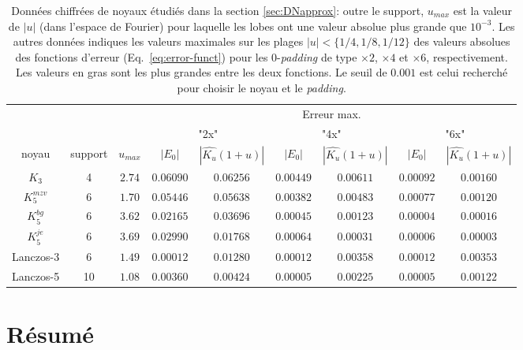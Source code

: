 \documentclass[11pt,twoside]{article}
\begin{document}
\begin{table}
\small
\centering
\begin{tabular}{c|c|c|cc|cc|cc}
\toprule
         &         &           & \multicolumn{6}{c}{Erreur max.} \\ 
         &         &           & \multicolumn{2}{c}{"2x"} & \multicolumn{2}{|c}{"4x"} & \multicolumn{2}{|c}{"6x"} \\
noyau    & support & $u_{max}$  &   $|E_0|$ & $|\widehat{K_u}(1+u)|$ & $|E_0|$ & $|\widehat{K_u}(1+u)|$ & $|E_0|$ & $|\widehat{K_u}(1+u)|$  \\ \midrule
$K_3$    &   4     &  $2.74$   &   $0.06090$ &	 $\mathbf{0.06256}$ & $0.00449$ & 	 $\mathbf{0.00611}$ & $ 0.00092$ &  	$\mathbf{0.00160}$ \\
$K_5^{mzv}$ & 6    & $1.70$ &   $0.05446$ 	& $\mathbf{0.05638}$ & $0.00382$ & $\mathbf{0.00483}$ &  $0.00077$ 	 & $\mathbf{0.00120}$ \\
$K_5^{bg}$ & 6    & $3.62$ &   $0.02165$ 	& $\mathbf{0.03696}$ & $0.00045$ & $\mathbf{0.00123}$ &  $0.00004$ 	 & $\mathbf{0.00016}$ \\
$K_5^{je}$ & 6    & $3.69$ &   $0.02990$ 	& $\mathbf{0.01768}$ & $\mathbf{0.00064}$ & $0.00031$ &  $\mathbf{0.00006}$ 	 & $0.00003$ \\
Lanczos-3 & 6     &  $1.49$ &  $0.00012$ 	 & $\mathbf{0.01280}$ & $0.00012$ &  	$\mathbf{0.00358}$ & $0.00012$ &  	 $\mathbf{0.00353}$ \\
Lanczos-5 & 10    &  $1.08$ & $0.00360$  &  $\mathbf{0.00424}$ & $0.00005$ & $\mathbf{0.00225}$ & $0.00005$ & 	 $\mathbf{0.00122}$ \\
\bottomrule
\end{tabular}
\caption{Données chiffrées de noyaux étudiés dans la section \ref{sec:DNapprox}: outre le support, $u_{max}$ est la valeur de $|u|$ (dans l'espace de Fourier) pour laquelle les lobes ont une valeur absolue plus grande que $10^{-3}$. Les autres données indiques les valeurs maximales sur les plages $|u|<\{1/4,1/8,1/12\}$ des valeurs absolues des fonctions d'erreur (Eq.~\ref{eq:error-funct}) pour les 0-\textit{padding} de type $\times 2$, $\times 4$ et $\times 6$, respectivement. Les valeurs en gras sont les plus grandes entre les deux fonctions. Le seuil de $0.001$ est celui recherché pour choisir le noyau et le \textit{padding}.}
\label{tab-scoeff-bsplinecardapprox}
\end{table}



%
\section{Résumé}
% 
\end{document}
